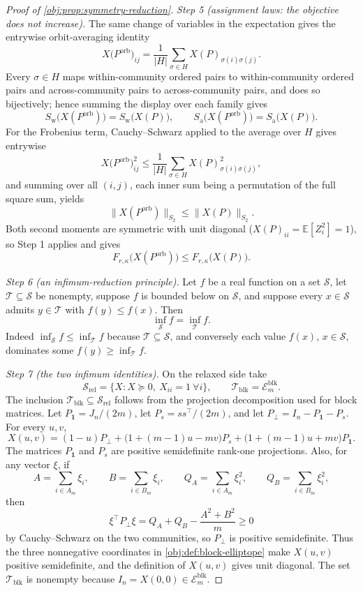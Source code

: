\begin{proof}[Proof of \cref{obj:prop:symmetry-reduction}]
\emph{Step 5 (assignment laws: the objective does not increase).}  The same change of variables in the expectation gives the entrywise orbit-averaging identity
\[
X\bigl(P^{\mathrm{orb}}\bigr)_{ij}
=\frac{1}{|H|}\sum_{\sigma\in H}X(P)_{\sigma(i)\sigma(j)} .
\]
Every \(\sigma\in H\) maps within-community ordered pairs to within-community ordered pairs and across-community pairs to across-community pairs, and does so bijectively; hence summing the display over each family gives
\[
S_{\mathrm{w}}\bigl(X(P^{\mathrm{orb}})\bigr)=S_{\mathrm{w}}\bigl(X(P)\bigr),
\qquad
S_{\mathrm{a}}\bigl(X(P^{\mathrm{orb}})\bigr)=S_{\mathrm{a}}\bigl(X(P)\bigr).
\]
For the Frobenius term, Cauchy--Schwarz applied to the average over \(H\) gives entrywise
\[
X\bigl(P^{\mathrm{orb}}\bigr)_{ij}^2
\le\frac{1}{|H|}\sum_{\sigma\in H}X(P)_{\sigma(i)\sigma(j)}^2 ,
\]
and summing over all \((i,j)\), each inner sum being a permutation of the full square sum, yields
\[
\bigl\|X(P^{\mathrm{orb}})\bigr\|_{S_2}\le\bigl\|X(P)\bigr\|_{S_2}.
\]
Both second moments are symmetric with unit diagonal (\(X(P)_{ii}=\mathbb E[Z_i^2]=1\)), so Step 1 applies and gives
\[
F_{r,\kappa}\bigl(X(P^{\mathrm{orb}})\bigr)\le F_{r,\kappa}\bigl(X(P)\bigr).
\]

\emph{Step 6 (an infimum-reduction principle).}  Let \(f\) be a real function on a set \(\mathcal S\), let \(\mathcal T\subseteq\mathcal S\) be nonempty, suppose \(f\) is bounded below on \(\mathcal S\), and suppose every \(x\in\mathcal S\) admits \(y\in\mathcal T\) with \(f(y)\le f(x)\).  Then
\[
\inf_{\mathcal S}f=\inf_{\mathcal T}f .
\]
Indeed \(\inf_{\mathcal S}f\le\inf_{\mathcal T}f\) because \(\mathcal T\subseteq\mathcal S\), and conversely each value \(f(x)\), \(x\in\mathcal S\), dominates some \(f(y)\ge\inf_{\mathcal T}f\). %

\emph{Step 7 (the two infimum identities).}  On the relaxed side take
\[
\mathcal S_{\mathrm{rel}}=\{X:X\succeq0,\ X_{ii}=1\ \forall i\},
\qquad
\mathcal T_{\mathrm{blk}}=\mathcal E_m^{\mathrm{blk}} .
\]
The inclusion \(\mathcal T_{\mathrm{blk}}\subseteq\mathcal S_{\mathrm{rel}}\) follows from the projection decomposition used for block matrices.  Let \(P_{\mathbf 1}=J_n/(2m)\), let \(P_s=ss^\top/(2m)\), and let \(P_\perp=I_n-P_{\mathbf 1}-P_s\).  For every \(u,v\),
\[
X(u,v)=(1-u)P_\perp
+\bigl(1+(m-1)u-mv\bigr)P_s
+\bigl(1+(m-1)u+mv\bigr)P_{\mathbf 1}.
\]
The matrices \(P_{\mathbf 1}\) and \(P_s\) are positive semidefinite rank-one projections.  Also, for any vector \(\xi\), if
\[
A=\sum_{i\in A_m}\xi_i,
\qquad
B=\sum_{i\in B_m}\xi_i,
\qquad
Q_A=\sum_{i\in A_m}\xi_i^2,
\qquad
Q_B=\sum_{i\in B_m}\xi_i^2,
\]
then
\[
\xi^\top P_\perp \xi
=Q_A+Q_B-\frac{A^2+B^2}{m}\ge0
\]
by Cauchy--Schwarz on the two communities, so \(P_\perp\) is positive semidefinite.  Thus the three nonnegative coordinates in \cref{obj:def:block-elliptope} make \(X(u,v)\) positive semidefinite, and the definition of \(X(u,v)\) gives unit diagonal. %
The set \(\mathcal T_{\mathrm{blk}}\) is nonempty because \(I_n=X(0,0)\in\mathcal E_m^{\mathrm{blk}}\).


\end{proof}
